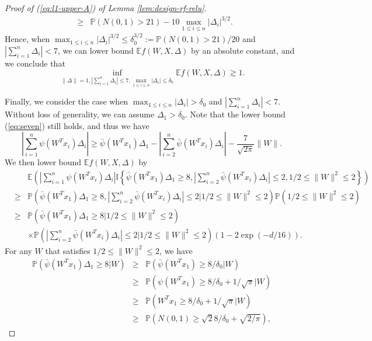 \begin{proof}[Proof of (\ref{eq:l1-upper-A}) of Lemma \ref{lem:design-rf-relu}]
\begin{eqnarray}
\nonumber &\geq& \mathbb{P}\left(N(0,1)>21\right) - 10\max_{1\leq i\leq n}|\Delta_i|^{3/2}.
\end{eqnarray}
Hence, when $\max_{1\leq i\leq n}|\Delta_i|^{3/2}\leq \delta_0^{3/2}:=\mathbb{P}\left(N(0,1)>21\right)/20$ and $\left|\sum_{i=1}^n\Delta_i\right|< 7$, we can lower bound $\mathbb{E}f(W,X,\Delta)$ by an absolute constant, and we conclude that
\begin{equation}
\inf_{\|\Delta\|=1,|\sum_{i=1}^n\Delta_i|\leq 7, \max_{1\leq i\leq n}|\Delta_i|\leq\delta_0}\mathbb{E}f(W,X,\Delta) \gtrsim 1.\label{eq:l1-1-2-relu}
\end{equation}

Finally, we consider the case when $\max_{1\leq i\leq n}|\Delta_i|> \delta_0$ and $\left|\sum_{i=1}^n\Delta_i\right|< 7$. Without loss of generality, we can assume $\Delta_1>\delta_0$. Note that the lower bound (\ref{eq:seven}) still holds, and thus we have
$$\left|\sum_{i=1}^n\psi(W^Tx_i)\Delta_i\right|\geq  \bar{\psi}(W^Tx_1)\Delta_1 - \left|\sum_{i=2}^n\bar{\psi}(W^Tx_i)\Delta_i\right| - \frac{7}{\sqrt{2\pi}}\|W\|.$$
We then lower bound $\mathbb{E}f(W,X,\Delta)$ by
\begin{eqnarray*}
&& \mathbb{E}\left(\left|\sum_{i=1}^n\psi(W^Tx_i)\Delta_i\right|\mathbb{I}\left\{ \bar{\psi}(W^Tx_1)\Delta_1 \geq 8, \left|\sum_{i=2}^n\bar{\psi}(W^Tx_i)\Delta_i\right|\leq 2, 1/2\leq \|W\|^2\leq 2\right\}\right) \\
&\geq& \mathbb{P}\left(\bar{\psi}(W^Tx_1)\Delta_1 \geq 8, \left|\sum_{i=2}^n\bar{\psi}(W^Tx_i)\Delta_i\right|\leq 2\Big|1/2\leq \|W\|^2\leq 2\right)\mathbb{P}\left(1/2\leq \|W\|^2\leq 2\right) \\
&\geq& \mathbb{P}\left(\bar{\psi}(W^Tx_1)\Delta_1 \geq 8\Big|1/2\leq \|W\|^2\leq 2\right) \\
&& \times \mathbb{P}\left(\left|\sum_{i=2}^n\bar{\psi}(W^Tx_i)\Delta_i\right|\leq 2\Big|1/2\leq \|W\|^2\leq 2\right)\left(1-2\exp(-d/16)\right).
\end{eqnarray*}
For any $W$ that satisfies $1/2\leq \|W\|^2\leq 2$, we have
\begin{eqnarray*}
\mathbb{P}\left(\bar{\psi}(W^Tx_1)\Delta_1 \geq 8\Big|W\right) &\geq& \mathbb{P}\left(\bar{\psi}(W^Tx_1)\geq 8/\delta_0\Big|W\right) \\
&\geq&  \mathbb{P}\left(\psi(W^Tx_1)\geq 8/\delta_0+1/\sqrt{\pi}\Big|W\right) \\
&\geq& \mathbb{P}\left(W^Tx_1\geq 8/\delta_0+1/\sqrt{\pi}\Big|W\right) \\
&\geq& \mathbb{P}\left(N(0,1)\geq \sqrt{2}8/\delta_0 + \sqrt{2/\pi}\right),

\end{eqnarray*}
\end{proof}
